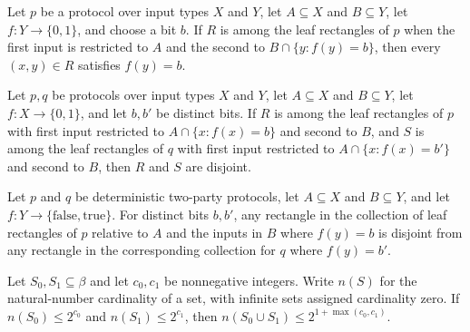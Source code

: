 \begin{lemma}
\label{CommunicationComplexity.Deterministic.Protocol.aux_bob_bit}
\leanok
{}
Let $p$ be a protocol over input types $X$ and $Y$, let $A\subseteq X$ and $B\subseteq
Y$, let $f:Y\to\{0,1\}$, and choose a bit $b$. If $R$ is among the leaf rectangles of
$p$ when the first input is restricted to $A$ and the second to $B\cap\{y:f(y)=b\}$,
then every $(x,y)\in R$ satisfies $f(y)=b$.
\end{lemma}

\begin{lemma}
\label{CommunicationComplexity.Deterministic.Protocol.aux_disjoint_alice_of_ne}
\leanok
{}
Let $p,q$ be protocols over input types $X$ and $Y$, let $A\subseteq X$ and $B\subseteq
Y$, let $f:X\to\{0,1\}$, and let $b,b'$ be distinct bits. If $R$ is among the leaf
rectangles of $p$ with first input restricted to $A\cap\{x:f(x)=b\}$ and second to $B$,
and $S$ is among the leaf rectangles of $q$ with first input restricted to
$A\cap\{x:f(x)=b'\}$ and second to $B$, then $R$ and $S$ are disjoint.
\end{lemma}

\begin{lemma}
\label{CommunicationComplexity.Deterministic.Protocol.aux_disjoint_bob_of_ne}
\leanok
{}
Let $p$ and $q$ be deterministic two-party protocols, let $A\subseteq X$ and $B\subseteq
Y$, and let $f:Y\to\{\mathrm{false},\mathrm{true}\}$. For distinct bits $b,b'$, any
rectangle in the collection of leaf rectangles of $p$ relative to $A$ and the inputs in
$B$ where $f(y)=b$ is disjoint from any rectangle in the corresponding collection for
$q$ where $f(y)=b'$.
\end{lemma}

\begin{lemma}
\label{CommunicationComplexity.Deterministic.Protocol.aux_card_step}
\leanok
{}
Let $S_0,S_1\subseteq\beta$ and let $c_0,c_1$ be nonnegative integers. Write $n(S)$ for
the natural-number cardinality of a set, with infinite sets assigned cardinality zero.
If $n(S_0)\le 2^{c_0}$ and $n(S_1)\le 2^{c_1}$, then $n(S_0\cup S_1)\le
2^{1+\max(c_0,c_1)}$.
\end{lemma}
